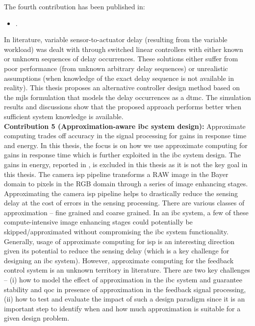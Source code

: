 The fourth contribution has been published in:
\begin{itemize}
    \item {}.
\end{itemize}
In literature, variable sensor-to-actuator delay (resulting from the variable workload) was dealt with through switched linear controllers with either known or unknown sequences of delay occurrences. These solutions either suffer from poor performance (from unknown arbitrary delay sequences) or unrealistic assumptions (when knowledge of the exact delay sequence is not available in reality). 
This thesis proposes an alternative controller design method based on the \gls{mjls} formulation that models the delay occurrences as a \gls{dtmc}. The simulation results and discussions show that the proposed approach performs better when sufficient system knowledge is available.
\\[1ex]
\noindent
\textbf{Contribution 5 (Approximation-aware \gls{ibc} system design):}
Approximate computing trades off accuracy in the signal processing for gains in response time and energy. 
In this thesis, the focus is on how we use approximate computing for gains in response time which is further exploited in the \gls{ibc} system design.
The gains in energy, reported in \cite{de2020access}, is excluded in this thesis as it is not the key goal in this thesis.
The camera \gls{isp} pipeline transforms a RAW image in the Bayer domain to pixels in the RGB domain through a series of image enhancing stages. Approximating the camera \gls{isp} pipeline helps to drastically reduce the sensing delay at the cost of errors in the sensing processing. There are various classes of approximation -- fine grained and coarse grained. In an \gls{ibc} system, a few of these compute-intensive image enhancing stages could potentially be skipped/approximated without compromising the \gls{ibc} system functionality.
Generally, usage of approximate computing for \gls{isp} is an interesting direction given its potential to reduce the sensing delay (which is a key challenge for designing an \gls{ibc} system). However, approximate computing for the feedback control system is an unknown territory in literature. There are two key challenges -- (i) how to model the effect of approximation in the \gls{ibc} system and guarantee stability and \gls{qoc} in presence of approximation in the feedback signal processing, (ii) how to test and evaluate the impact of such a design paradigm since it is an important step to identify when and how much approximation is suitable for a given design problem. 

